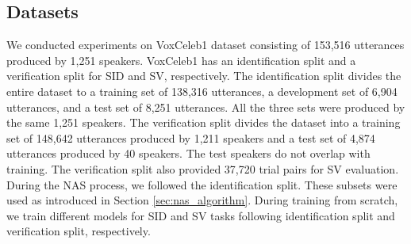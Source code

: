 \documentclass[a4paper]{article}
\begin{document}
\begin{table*}[ht]
\vspace{-0.5em}
\begin{center}
\caption{Speaker identification and speaker verification performance on VoxCeleb1 dataset. Dimensions indicate the dimensionality of the speaker embedding.  denotes the number of neural cells, and  denotes the number of initial channels.}
\vspace{-0.5em}
\label{table:results}
\end{center}
\vspace{-20pt}
\end{table*}


\subsection{Datasets}
We conducted experiments on VoxCeleb1 \cite{nagrani2017voxceleb} dataset consisting of 153,516 utterances produced by 1,251 speakers. VoxCeleb1 has an identification split and a verification split for SID and SV, respectively. The identification split divides the entire dataset to a training set of 138,316 utterances, a development set of 6,904 utterances, and a test set of 8,251 utterances.  All the three sets were produced by the same 1,251 speakers. The verification split divides the dataset into a training set of 148,642 utterances produced by 1,211 speakers and a test set of 4,874 utterances produced by 40 speakers. The test speakers do not overlap with training. The verification split also provided 37,720 trial pairs for SV evaluation. During the NAS process, we followed the identification split. These subsets were used as introduced in Section \ref{sec:nas_algorithm}. During training from scratch, we train different models for SID and SV tasks following identification split and verification split, respectively.
\end{document}
